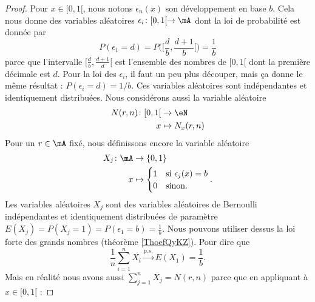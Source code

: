 \begin{proof}
    Pour \( x\in\mathopen[ 0 , 1 [\), nous notons \( \epsilon_n(x)\) son développement en base \( b\). Cela nous donne des variables aléatoires \( \epsilon_i\colon \mathopen[ 0 , 1 [\to \mA\) dont la loi de probabilité est donnée par
    \begin{equation}
        P(\epsilon_1=d)=P\big( \mathopen[ \frac{ d }{ b } , \frac{ d+1 }{ b } [ \big)=\frac{1}{ b }
    \end{equation}
    parce que l'intervalle \( \mathopen[ \frac{ d }{ b } , \frac{ d+1 }{ d } [\) est l'ensemble des nombres de \( \mathopen[ 0 , 1 [\) dont la première décimale est \( d\). Pour la loi des \( \epsilon_i\), il faut un peu plus découper, mais ça donne le même résultat : \( P(\epsilon_i=d)=1/b\). Ces variables aléatoires sont indépendantes et identiquement distribuées. Nous considérons aussi la variable aléatoire
    \begin{equation}
        \begin{aligned}
            N(r,n)\colon \mathopen[ 0 , 1 [&\to \eN \\
            x&\mapsto N_x(r,n) 
        \end{aligned}
    \end{equation}
    Pour un \( r\in\mA\) fixé, nous définissons encore la variable aléatoire
    \begin{equation}
        \begin{aligned}
            X_j\colon \mA&\to \{ 0,1 \} \\
            x&\mapsto \begin{cases}
                1    &   \text{si } \epsilon_j(x)=b\\
                0    &    \text{sinon.}
            \end{cases}.
        \end{aligned}
    \end{equation}
    Les variables aléatoires \( X_j\) sont des variables aléatoires de Bernoulli indépendantes et identiquement distribuées de paramètre \( E(X_j)=P(X_j=1)=P(\epsilon_1=b)=\frac{1}{ b }\). Nous pouvons utiliser dessus la loi forte des grands nombres (théorème \ref{ThoefQyKZ}). Pour dire que
    \begin{equation}    \label{EqNALwzsh}
        \frac{1}{n }\sum_{i=1}^nX_i\stackrel{p.s.}{\longrightarrow}E(X_1)=\frac{1}{ b }.
    \end{equation}
    Mais en réalité nous avons aussi \( \sum_{j=1}^nX_j=N(r,n)\) parce que en appliquant à \( x\in\mathopen[ 0 , 1 [\) :

\end{proof}
